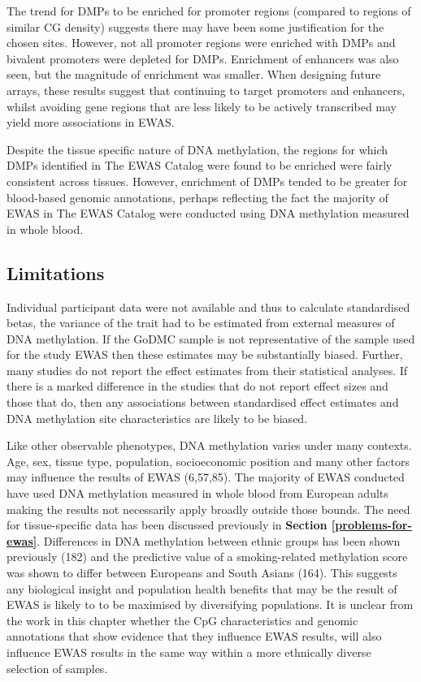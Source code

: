 \documentclass[11pt,twoside]{bristolthesis}
\begin{document}
The trend for DMPs to be enriched for promoter regions (compared to regions of similar CG density) suggests there may have been some justification for the chosen sites. However, not all promoter regions were enriched with DMPs and bivalent promoters were depleted for DMPs. Enrichment of enhancers was also seen, but the magnitude of enrichment was smaller. When designing future arrays, these results suggest that continuing to target promoters and enhancers, whilst avoiding gene regions that are less likely to be actively transcribed may yield more associations in EWAS.

Despite the tissue specific nature of DNA methylation, the regions for which DMPs identified in The EWAS Catalog were found to be enriched were fairly consistent across tissues. However, enrichment of DMPs tended to be greater for blood-based genomic annotations, perhaps reflecting the fact the majority of EWAS in The EWAS Catalog were conducted using DNA methylation measured in whole blood.

\hypertarget{limitations-04}{%
\subsection{Limitations}\label{limitations-04}}

Individual participant data were not available and thus to calculate standardised betas, the variance of the trait had to be estimated from external measures of DNA methylation. If the GoDMC sample is not representative of the sample used for the study EWAS then these estimates may be substantially biased. Further, many studies do not report the effect estimates from their statistical analyses. If there is a marked difference in the studies that do not report effect sizes and those that do, then any associations between standardised effect estimates and DNA methylation site characteristics are likely to be biased.

Like other observable phenotypes, DNA methylation varies under many contexts. Age, sex, tissue type, population, socioeconomic position and many other factors may influence the results of EWAS (6,57,85). The majority of EWAS conducted have used DNA methylation measured in whole blood from European adults making the results not necessarily apply broadly outside those bounds. The need for tissue-specific data has been discussed previously in \textbf{Section \ref{problems-for-ewas}}. Differences in DNA methylation between ethnic groups has been shown previously (182) and the predictive value of a smoking-related methylation score was shown to differ between Europeans and South Asians (164). This suggests any biological insight and population health benefits that may be the result of EWAS is likely to to be maximised by diversifying populations. It is unclear from the work in this chapter whether the CpG characteristics and genomic annotations that show evidence that they influence EWAS results, will also influence EWAS results in the same way within a more ethnically diverse selection of samples.
\end{document}
